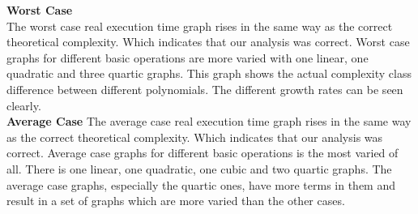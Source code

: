 \documentclass[10pt]{article}
\begin{document}
\textbf{Worst Case} \\
\indent The worst case real execution time graph rises in the same way as the correct theoretical complexity. Which indicates that our analysis was correct. Worst case graphs for different basic operations are more varied with one linear, one quadratic and three quartic graphs. This graph shows the actual complexity class difference between different polynomials. The different growth rates can be seen clearly. \\ 

\textbf{Average Case}
\indent The average case real execution time graph rises in the same way as the correct theoretical complexity. Which indicates that our analysis was correct. Average case graphs for different basic operations is the most varied of all. There is one linear, one quadratic, one cubic and two quartic graphs. The average case graphs, especially the quartic ones, have more terms in them and result in a set of graphs which are more varied than the other cases. \\ 
\end{document}
